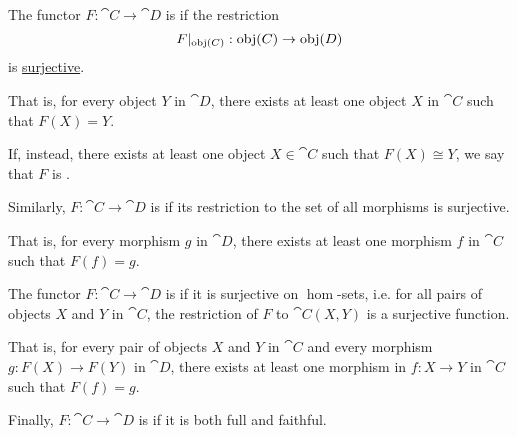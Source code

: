 \begin{definition}
\begin{thmenum}
     The functor \( F: \cat{C} \to \cat{D} \) is  if the restriction
    \begin{equation*}
      F\vert_{\operatorname{obj}(C)}: \operatorname{obj}(C) \to \operatorname{obj}(D)
    \end{equation*}
    is \hyperref[def:function_invertibility/surjective]{surjective}.

    That is, for every object \( Y \) in \( \cat{D} \), there exists at least one object \( X \) in \( \cat{C} \) such that \( F(X) = Y \).

    If, instead, there exists at least one object \( X \in \cat{C} \) such that \( F(X) \cong Y \), we say that \( F \) is .

     Similarly, \( F: \cat{C} \to \cat{D} \) is  if its restriction to the set of all morphisms is surjective.

    That is, for every morphism \( g \) in \( \cat{D} \), there exists at least one morphism \( f \) in \( \cat{C} \) such that \( F(f) = g \).

     The functor \( F: \cat{C} \to \cat{D} \) is  if it is surjective on \( \hom \)-sets, i.e. for all pairs of objects \( X \) and \( Y \) in \( \cat{C} \), the restriction of \( F \) to \( \cat{C}(X, Y) \) is a surjective function.

    That is, for every pair of objects \( X \) and \( Y \) in \( \cat{C} \) and every morphism \( g: F(X) \to F(Y) \) in \( \cat{D} \), there exists at least one morphism in \( f: X \to Y \) in \( \cat{C} \) such that \( F(f) = g \).

     Finally, \( F: \cat{C} \to \cat{D} \) is  if it is both full and faithful.
  \end{thmenum}
\end{definition}

